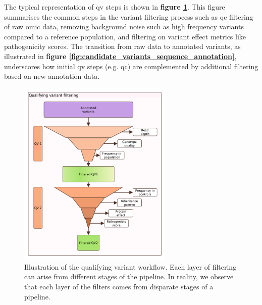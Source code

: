 
The typical representation of \ac{qv} steps is shown in \textbf{figure \ref{fig:qv_filter_pyramid_vcurrent}}.
This figure summarises the common steps in the variant filtering process such as \ac{qc} filtering of raw omic data,
removing background noise such as high frequency variants compared to a reference population, and filtering on variant effect metrics like pathogenicity scores.
The transition from raw data to annotated variants, as illustrated in \textbf{figure \ref{fig:candidate_variants_sequence_annotation}}, underscores how initial \ac{qv} steps (e.g. \ac{qc}) are complemented by additional filtering based on new annotation data.
 
\begin{figure}
\centering
     \includegraphics[width=0.66\textwidth]{./images/qv_filter_pyramid_vcurrent.pdf}
\caption{Illustration of the qualifying variant workflow. Each layer of filtering can arise from different stages of the pipeline. In reality, we observe that each layer of the filters comes from disparate stages of a pipeline.}
    \label{fig:qv_filter_pyramid_vcurrent}
\end{figure}

